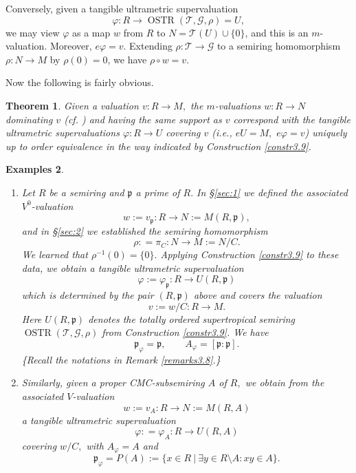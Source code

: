 \documentclass [12pt,a4paper,reqno]{amsart}
\newtheorem{thm}{Theorem} [section]
\newtheorem{examples}[thm]{Examples}
\begin{document}
Conversely, given a tangible ultrametric supervaluation $$\varphi:
R\to {\operatorname{OSTR}}({\mathcal T},{\mathcal G} ,\rho)=U,$$ we may view $\varphi$ as a map $w$
from $R$ to $N={\mathcal T}(U)\cup\{0\}$, and this is an $m$-valuation.
Moreover, $e\varphi=v.$ Extending $\rho: {\mathcal T}\to {\mathcal G} $ to a
semiring homomorphism $\rho: N\to M$ by $\rho(0)=0$, we have
$\rho\circ w=v.$

Now the following is fairly obvious.

\begin{thm}\label{thm3.10}
Given a valuation $v: R\to M,$ the $m$-valuations $w:R\to N$
dominating $v$ (cf. \cite[\S2]{IKR1}) and having the same support
as $v$ correspond with the tangible ultrametric supervaluations
$\varphi: R\to U$ covering $v$ (i.e., $eU=M,$ $ e\varphi=v$)
uniquely up to order equivalence in the way indicated by
Construction \ref{constr3.9}.
\end{thm}

\begin{examples}\label{examps3.11} $ $

\begin{enumerate} {{}}
    \item  Let $R$ be a semiring and ${\mathfrak p}$ a prime of $R.$ In \S\ref{sec:1} we
defined the associated $V^0$-valuation
$$w:=v_{\mathfrak p}:R\to N:=M(R,{\mathfrak p}),$$
and in \S\ref{sec:2} we established the semiring homomorphism
$$\rho: = \pi_C:N\to M:=N/C.$$
We learned that $\rho^{-1}(0)=\{0\}.$ Applying Construction
\ref{constr3.9} to these  data, we obtain a tangible ultrametric
supervaluation
$$\varphi:=\varphi_{\mathfrak p}: R\to U(R,{\mathfrak p})$$
which is determined by the pair $(R,{\mathfrak p})$ above and covers the
valuation
$$v:=w/C: R\to M.$$
Here $U(R,{\mathfrak p})$ denotes the totally ordered supertropical
semiring ${\operatorname{OSTR}}({\mathcal T},{\mathcal G} ,\rho)$ from Construction \ref{constr3.9}.
We  have
$${\mathfrak p}_\varphi={\mathfrak p},\qquad A_\varphi=[{\mathfrak p}:{\mathfrak p}].$$ \{Recall the notations in Remark
\ref{remarks3.8}.\} {\vskip 1.5mm \noindent}

\item  Similarly, given a proper CMC-subsemiring $A$ of $R,$ we
obtain from the associated $V$-valuation
$$w:=v_A: R\to N:=M(R,A)$$
a tangible ultrametric supervaluation
$$\varphi: =\varphi_A:R\to U(R,A)$$
covering $w/C,$ with $A_\varphi=A$ and
$${\mathfrak p}_\varphi = P(A):= \{x\in R {\ {|} \ }\exists y\in R\setminus A:
xy\in A\}.$$

\end{enumerate}

\end{examples}
\end{document}
